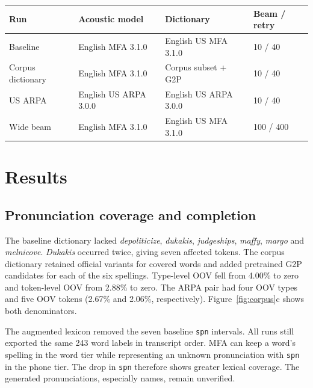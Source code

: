 \documentclass[11pt,a4paper]{article}
\newcommand{\measure}[1]{\texttt{#1}}
\begin{document}
\begin{center}
\label{tab:configs}
\smallskip
\begin{tabular}{llll}
\toprule
Run & Acoustic model & Dictionary & Beam / retry\\
\midrule
Baseline & English MFA 3.1.0 & English US MFA 3.1.0 & 10 / 40\\
Corpus dictionary & English MFA 3.1.0 & Corpus subset + G2P & 10 / 40\\
US ARPA & English US ARPA 3.0.0 & English US ARPA 3.0.0 & 10 / 40\\
Wide beam & English MFA 3.1.0 & English US MFA 3.1.0 & 100 / 400\\
\bottomrule
\end{tabular}
\end{center}

\section{Results}
\subsection{Pronunciation coverage and completion}
The baseline dictionary lacked \emph{depoliticize}, \emph{dukakis}, \emph{judgeships}, \emph{maffy}, \emph{margo} and \emph{melnicove}. \emph{Dukakis} occurred twice, giving seven affected tokens. The corpus dictionary retained official variants for covered words and added pretrained G2P candidates for each of the six spellings. Type-level OOV fell from 4.00\% to zero and token-level OOV from 2.88\% to zero. The ARPA pair had four OOV types and five OOV tokens (2.67\% and 2.06\%, respectively). Figure~\ref{fig:corpus}c shows both denominators.

The augmented lexicon removed the seven baseline \measure{spn} intervals. All runs still exported the same 243 word labels in transcript order. MFA can keep a word's spelling in the word tier while representing an unknown pronunciation with \measure{spn} in the phone tier. The drop in \measure{spn} therefore shows greater lexical coverage. The generated pronunciations, especially names, remain unverified.
\end{document}
